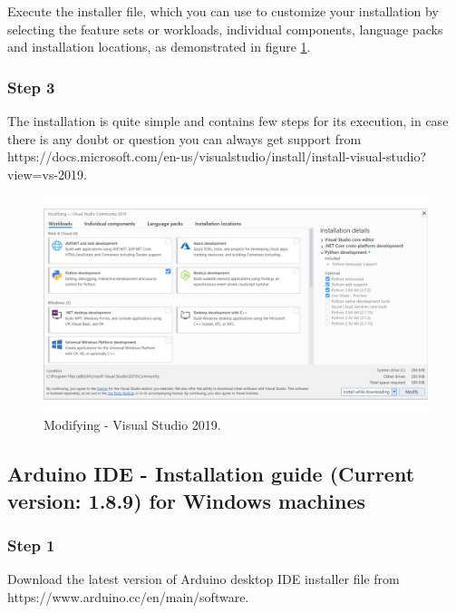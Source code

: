 \begin{refsection}
Execute the installer file, which you can use to customize your installation by selecting the feature sets or workloads, individual components, language packs and installation locations, as demonstrated in figure \ref{vstudioWorkloads}. 



\subsubsection{Step 3}

The installation is quite simple and contains few steps for its execution, in case there is any doubt or question you can always get support from https://docs.microsoft.com/en-us/visualstudio/install/install-visual-studio?view=vs-2019.

\begin{figure}[H]
	\centering
	\includegraphics[width=1\linewidth]{./sdf/arduino_quantum_rx/figures/VSworkloads.pdf}
	\caption{Modifying - Visual Studio 2019.}
	\label{vstudioWorkloads}
\end{figure}

\subsection{Arduino IDE - Installation guide (Current version: 1.8.9) for Windows machines}

\subsubsection{Step 1}

Download the latest version of Arduino desktop IDE installer file from https://www.arduino.cc/en/main/software.


\end{refsection}
